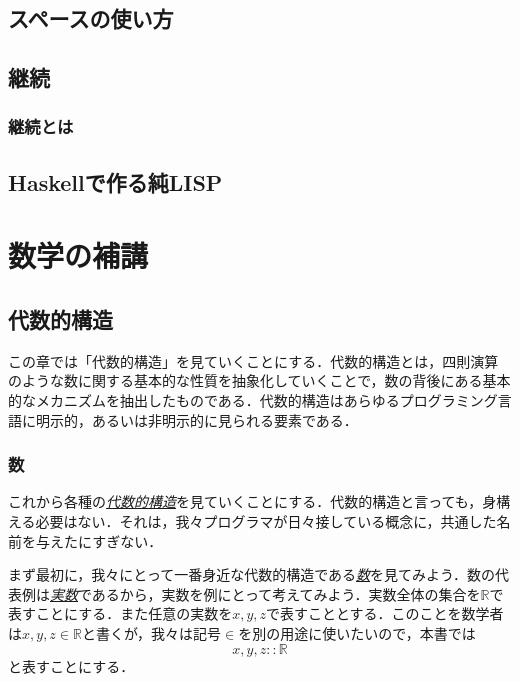 \documentclass[a4paper]{jsbook}
\newenvironment{leader}{\begingroup}{\endgroup}
\newcommand{\keyword}[1]{{\underline{\emph{#1}}}}
\newcommand{\mathSpecialSet}[1]{\mathbb{#1}} %
\newcommand{\mathIn}{\mathrel{::}}
\begin{document}
\chapter{スペースの使い方}

\chapter{継続}

\section{継続とは}




\chapter{Haskellで作る純LISP}

\part{数学の補講}


\chapter{代数的構造}

\begin{leader}
この章では「代数的構造」を見ていくことにする．代数的構造とは，四則演算のような数に関する基本的な性質を抽象化していくことで，数の背後にある基本的なメカニズムを抽出したものである．代数的構造はあらゆるプログラミング言語に明示的，あるいは非明示的に見られる要素である．
\end{leader}

\section{数}

これから各種の\keyword{代数的構造}を見ていくことにする．代数的構造と言っても，身構える必要はない．それは，我々プログラマが日々接している概念に，共通した名前を与えたにすぎない．

まず最初に，我々にとって一番身近な代数的構造である\keyword{数}を見てみよう．数の代表例は\keyword{実数}であるから，実数を例にとって考えてみよう．実数全体の集合を$\mathSpecialSet{R}$で表すことにする．また任意の実数を$x,y,z$で表すこととする．このことを数学者は$x,y,z\in\mathSpecialSet{R}$と書くが，我々は記号$\in$を別の用途に使いたいので，本書では
\begin{equation}
x,y,z\mathIn\mathSpecialSet{R}
\end{equation}
と表すことにする．
\end{document}
